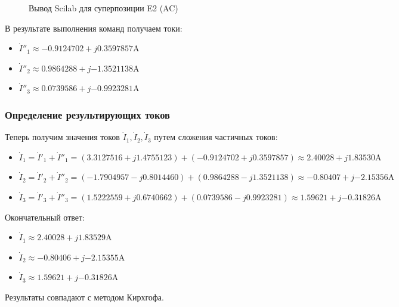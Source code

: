 \documentclass[14pt, a4paper]{styles/gost-7-32} %
\newcommand{\complex}[2]{{#1} + j{#2}}
\begin{document}
    \begin{figure}[H]
      \centering
      \caption{Вывод Scilab для суперпозиции E2 (AC)}
      \label{fig:scilab_super2_out}
    \end{figure}

В результате выполнения команд получаем токи:
\begin{itemize}
    \item $\dot{I}''_1 \approx \complex{-0.9124702}{0.3597857} \si{\ampere}$
    \item $\dot{I}''_2 \approx \complex{0.9864288}{-1.3521138} \si{\ampere}$
    \item $\dot{I}''_3 \approx \complex{0.0739586}{-0.9923281} \si{\ampere}$
\end{itemize}

\subsubsection{Определение результирующих токов}
Теперь получим значения токов $\dot{I}_1, \dot{I}_2, \dot{I}_3$ путем сложения частичных токов:
\begin{itemize}
    \item $\dot{I}_1 = \dot{I}'_1 + \dot{I}''_1 = (3.3127516 + j 1.4755123) + (-0.9124702 + j 0.3597857) \approx \complex{2.40028}{1.83530} \si{\ampere}$
    \item $\dot{I}_2 = \dot{I}'_2 + \dot{I}''_2 = (-1.7904957 - j 0.8014460) + (0.9864288 - j 1.3521138) \approx \complex{-0.80407}{-2.15356} \si{\ampere}$
    \item $\dot{I}_3 = \dot{I}'_3 + \dot{I}''_3 = (1.5222559 + j 0.6740662) + (0.0739586 - j 0.9923281) \approx \complex{1.59621}{-0.31826} \si{\ampere}$
\end{itemize}
Окончательный ответ:
\begin{itemize}
    \item $\dot{I}_1 \approx \complex{2.40028}{1.83529} \si{\ampere}$
    \item $\dot{I}_2 \approx \complex{-0.80406}{-2.15355} \si{\ampere}$
    \item $\dot{I}_3 \approx \complex{1.59621}{-0.31826} \si{\ampere}$
\end{itemize}
Результаты совпадают с методом Кирхгофа.
\end{document}
